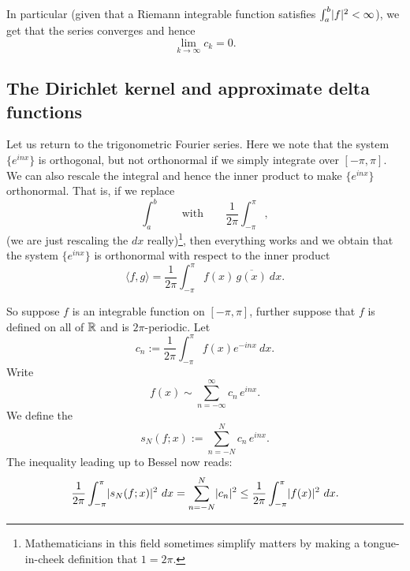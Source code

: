 In particular (given that a Riemann integrable function satisfies
$\int_a^b \lvert {f} \rvert^2 < \infty$), we get that the series
converges and hence
\begin{equation*}
\lim_{k \to \infty} c_k = 0 .
\end{equation*}

\subsection{The Dirichlet kernel and approximate delta functions}

Let us return to the trigonometric Fourier series.  Here we note that the
system $\{ e^{inx} \}$ is orthogonal, but not orthonormal if we simply
integrate over $[-\pi,\pi]$.  We can also rescale the integral
and hence the inner product to make 
$\{ e^{inx} \}$ orthonormal.  That is, if we replace
\begin{equation*}
\int_a^b \qquad \text{with} \qquad
\frac{1}{2\pi} \int_{-\pi}^\pi,
\end{equation*}
(we are just rescaling the $dx$ really)\footnote{%
Mathematicians in this field sometimes simplify matters by
making a tongue-in-cheek definition that $1=2\pi$.},
then everything works and we obtain that the system $\{ e^{inx} \}$
is orthonormal with respect to the inner product
\begin{equation*}
\langle f , g \rangle =
\frac{1}{2\pi} \int_{-\pi}^\pi f(x) \, \overline{g(x)} ~ dx .
\end{equation*}

So suppose $f$ is an integrable function on $[-\pi,\pi]$,
further suppose
that $f$ is defined on all of ${\mathbb{R}}$ and is $2\pi$-periodic.
Let
\begin{equation*}
c_n := 
\frac{1}{2\pi} \int_{-\pi}^\pi
f(x) e^{-inx} ~ dx .
\end{equation*}
Write
\begin{equation*}
f(x) \sim
\sum_{n=-\infty}^\infty c_n \,e^{inx} .
\end{equation*}
We define the \emph{}
\begin{equation*}
s_N(f;x) := 
\sum_{n=-N}^N c_n \,e^{inx} .
\end{equation*}
The inequality leading up to Bessel now reads:
\begin{equation*}
\frac{1}{2\pi} \int_{-\pi}^\pi
\lvert {s_N(f;x)} \rvert^2 ~ dx =
\sum_{n=-N}^N \lvert {c_n} \rvert^2
\leq
\frac{1}{2\pi} \int_{-\pi}^\pi
\lvert {f(x)} \rvert^2
~ dx .
\end{equation*}


